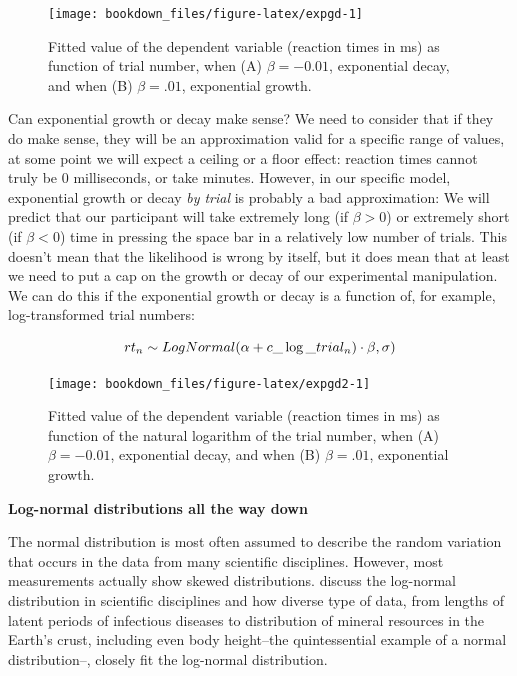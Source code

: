 \documentclass[12pt,]{krantz}
\theoremstyle{definition}
\theoremstyle{definition}
\theoremstyle{definition}
\theoremstyle{remark}
\begin{document}
\begin{figure}[H]
\texttt{[image: bookdown\_files/figure-latex/expgd-1]} \caption{Fitted value of the dependent variable (reaction times in
ms) as function of trial number, when (A) \(\beta = -0.01\), exponential
decay, and when (B) \(\beta =.01\), exponential growth.}\label{fig:expgd}
\end{figure}

Can exponential growth or decay make sense? We need to consider that if
they do make sense, they will be an approximation valid for a specific
range of values, at some point we will expect a ceiling or a floor
effect: reaction times cannot truly be 0 milliseconds, or take minutes.
However, in our specific model, exponential growth or decay \emph{by
trial} is probably a bad approximation: We will predict that our
participant will take extremely long (if \(\beta >0\)) or extremely
short (if \(\beta <0\)) time in pressing the space bar in a relatively
low number of trials. This doesn't mean that the likelihood is wrong by
itself, but it does mean that at least we need to put a cap on the
growth or decay of our experimental manipulation. We can do this if the
exponential growth or decay is a function of, for example,
log-transformed trial numbers:

\begin{equation}
rt_n \sim LogNormal(\alpha + c\_\log\_trial_n) \cdot \beta,\sigma)\\
\end{equation}






\begin{figure}[H]
\texttt{[image: bookdown\_files/figure-latex/expgd2-1]} \caption{Fitted value of the dependent variable (reaction times in
ms) as function of the natural logarithm of the trial number, when (A)
\(\beta=-0.01\), exponential decay, and when (B) \(\beta =.01\),
exponential growth.}\label{fig:expgd2}
\end{figure}

\textbf{Log-normal distributions all the way down}

The normal distribution is most often assumed to describe the random
variation that occurs in the data from many scientific disciplines.
However, most measurements actually show skewed distributions.
\citet{limpertLognormalDistributionsSciences2001} discuss the log-normal
distribution in scientific disciplines and how diverse type of data,
from lengths of latent periods of infectious diseases to distribution of
mineral resources in the Earth's crust, including even body height--the
quintessential example of a normal distribution--, closely fit the
log-normal distribution.
\end{document}
